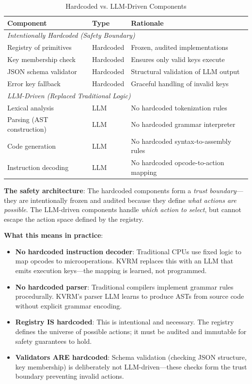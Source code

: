 \documentclass[11pt,a4paper]{article}
\begin{document}
\begin{table}[H]
\centering
\caption{Hardcoded vs. LLM-Driven Components}
\label{tab:hardcoded}
\begin{tabular}{@{}lll@{}}
\toprule
\textbf{Component} & \textbf{Type} & \textbf{Rationale} \\
\midrule
\multicolumn{3}{l}{\textit{Intentionally Hardcoded (Safety Boundary)}} \\
\midrule
Registry of primitives & Hardcoded & Frozen, audited implementations \\
Key membership check & Hardcoded & Ensures only valid keys execute \\
JSON schema validator & Hardcoded & Structural validation of LLM output \\
Error key fallback & Hardcoded & Graceful handling of invalid keys \\
\midrule
\multicolumn{3}{l}{\textit{LLM-Driven (Replaced Traditional Logic)}} \\
\midrule
Lexical analysis & LLM & No hardcoded tokenization rules \\
Parsing (AST construction) & LLM & No hardcoded grammar interpreter \\
Code generation & LLM & No hardcoded syntax-to-assembly rules \\
Instruction decoding & LLM & No hardcoded opcode-to-action mapping \\
\bottomrule
\end{tabular}
\end{table}

\textbf{The safety architecture}: The hardcoded components form a \textit{trust boundary}---they are intentionally frozen and audited because they define \textit{what actions are possible}. The LLM-driven components handle \textit{which action to select}, but cannot escape the action space defined by the registry.

\textbf{What this means in practice}:
\begin{itemize}
    \item \textbf{No hardcoded instruction decoder}: Traditional CPUs use fixed logic to map opcodes to microoperations. KVRM replaces this with an LLM that emits execution keys---the mapping is learned, not programmed.
    \item \textbf{No hardcoded parser}: Traditional compilers implement grammar rules procedurally. KVRM's parser LLM learns to produce ASTs from source code without explicit grammar encoding.
    \item \textbf{Registry IS hardcoded}: This is intentional and necessary. The registry defines the universe of possible actions; it must be audited and immutable for safety guarantees to hold.
    \item \textbf{Validators ARE hardcoded}: Schema validation (checking JSON structure, key membership) is deliberately not LLM-driven---these checks form the trust boundary preventing invalid actions.
\end{itemize}
\end{document}
